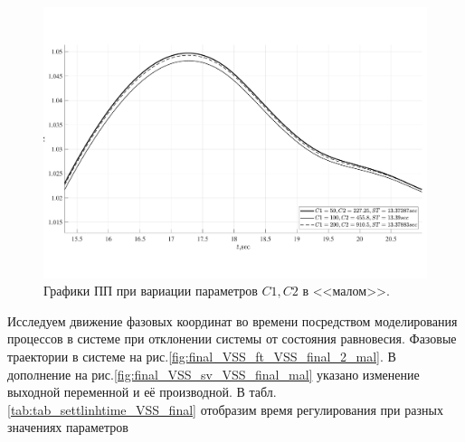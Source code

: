 \begin{figure}[!h]\centering
	\includegraphics[width=1\linewidth]{images/final_VSS_PWM_c1c2_zoom}
	\caption{ Графики ПП при вариации параметров $C1,C2$ в <<малом>>.}\label{fig:final_VSS_PWM_c1c2_zoom}
\end{figure}

Исследуем движение фазовых координат во времени посредством моделирования процессов в системе при отклонении системы от состояния равновесия. Фазовые траектории в системе на рис.\ref{fig:final_VSS_ft_VSS_final_2_mal}. 
В дополнение на рис.\ref{fig:final_VSS_sv_VSS_final_mal} указано изменение выходной переменной и её производной.
В табл.\ref{tab:tab_settlinhtime_VSS_final} отобразим время регулирования при разных значениях параметров

